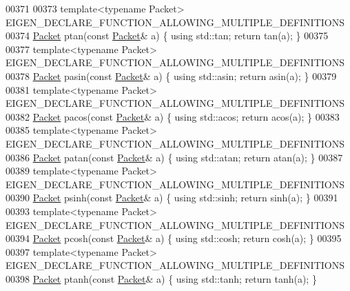 \begin{DoxyCode}
{00371 
00373 \textcolor{keyword}{template}<\textcolor{keyword}{typename} Packet> EIGEN\_DECLARE\_FUNCTION\_ALLOWING\_MULTIPLE\_DEFINITIONS
00374 \hyperlink{union_eigen_1_1internal_1_1_packet}{Packet} ptan(\textcolor{keyword}{const} \hyperlink{union_eigen_1_1internal_1_1_packet}{Packet}& a) \{ \textcolor{keyword}{using} std::tan; \textcolor{keywordflow}{return} tan(a); \}
00375 
00377 \textcolor{keyword}{template}<\textcolor{keyword}{typename} Packet> EIGEN\_DECLARE\_FUNCTION\_ALLOWING\_MULTIPLE\_DEFINITIONS
00378 \hyperlink{union_eigen_1_1internal_1_1_packet}{Packet} pasin(\textcolor{keyword}{const} \hyperlink{union_eigen_1_1internal_1_1_packet}{Packet}& a) \{ \textcolor{keyword}{using} std::asin; \textcolor{keywordflow}{return} asin(a); \}
00379 
00381 \textcolor{keyword}{template}<\textcolor{keyword}{typename} Packet> EIGEN\_DECLARE\_FUNCTION\_ALLOWING\_MULTIPLE\_DEFINITIONS
00382 \hyperlink{union_eigen_1_1internal_1_1_packet}{Packet} pacos(\textcolor{keyword}{const} \hyperlink{union_eigen_1_1internal_1_1_packet}{Packet}& a) \{ \textcolor{keyword}{using} std::acos; \textcolor{keywordflow}{return} acos(a); \}
00383 
00385 \textcolor{keyword}{template}<\textcolor{keyword}{typename} Packet> EIGEN\_DECLARE\_FUNCTION\_ALLOWING\_MULTIPLE\_DEFINITIONS
00386 \hyperlink{union_eigen_1_1internal_1_1_packet}{Packet} patan(\textcolor{keyword}{const} \hyperlink{union_eigen_1_1internal_1_1_packet}{Packet}& a) \{ \textcolor{keyword}{using} std::atan; \textcolor{keywordflow}{return} atan(a); \}
00387 
00389 \textcolor{keyword}{template}<\textcolor{keyword}{typename} Packet> EIGEN\_DECLARE\_FUNCTION\_ALLOWING\_MULTIPLE\_DEFINITIONS
00390 \hyperlink{union_eigen_1_1internal_1_1_packet}{Packet} psinh(\textcolor{keyword}{const} \hyperlink{union_eigen_1_1internal_1_1_packet}{Packet}& a) \{ \textcolor{keyword}{using} std::sinh; \textcolor{keywordflow}{return} sinh(a); \}
00391 
00393 \textcolor{keyword}{template}<\textcolor{keyword}{typename} Packet> EIGEN\_DECLARE\_FUNCTION\_ALLOWING\_MULTIPLE\_DEFINITIONS
00394 \hyperlink{union_eigen_1_1internal_1_1_packet}{Packet} pcosh(\textcolor{keyword}{const} \hyperlink{union_eigen_1_1internal_1_1_packet}{Packet}& a) \{ \textcolor{keyword}{using} std::cosh; \textcolor{keywordflow}{return} cosh(a); \}
00395 
00397 \textcolor{keyword}{template}<\textcolor{keyword}{typename} Packet> EIGEN\_DECLARE\_FUNCTION\_ALLOWING\_MULTIPLE\_DEFINITIONS
00398 \hyperlink{union_eigen_1_1internal_1_1_packet}{Packet} ptanh(\textcolor{keyword}{const} \hyperlink{union_eigen_1_1internal_1_1_packet}{Packet}& a) \{ \textcolor{keyword}{using} std::tanh; \textcolor{keywordflow}{return} tanh(a); \}
}
\end{DoxyCode}
